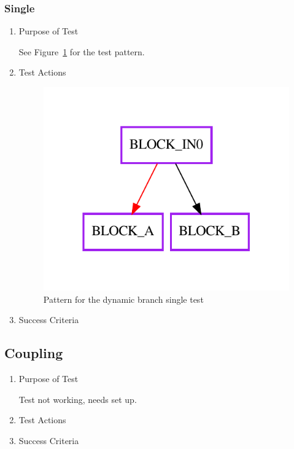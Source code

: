 \documentclass[12pt,a4paper]{report}
\begin{document}
\subsubsection{Single}
\begin{enumerate}
	\item Purpose of Test

	See Figure~\ref{fig:Pattern_for_the_dynamic_branch_single_test} for the test pattern.
	\item Test Actions
    \begin{figure}
        \centering 
        \includegraphics{TestPattern/dynamic_branch_single.pdf}
        \caption{Pattern for the dynamic branch single test}
        \label{fig:Pattern_for_the_dynamic_branch_single_test}
    \end{figure}
	\item Success Criteria
\end{enumerate}
\subsection{Coupling}
\begin{enumerate}
	\item Purpose of Test

	Test not working, needs set up.
	\item Test Actions
	\item Success Criteria
\end{enumerate}
\end{document}
